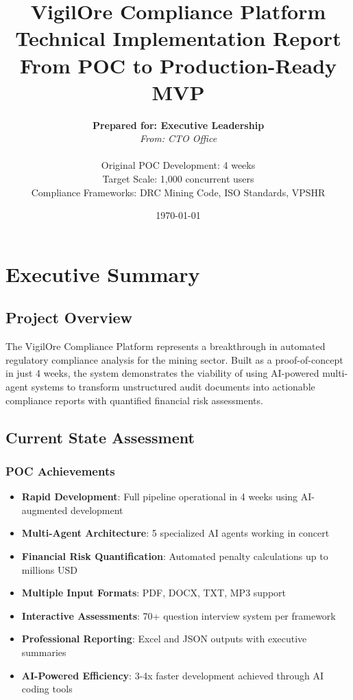 \documentclass[12pt,a4paper]{report}
\title{\textbf{VigilOre Compliance Platform}\\
\Large Technical Implementation Report\\
\large From POC to Production-Ready MVP}
\author{
    \textbf{Prepared for: Executive Leadership}\\
    \textit{From: CTO Office}\\
    \\
    Original POC Development: 4 weeks\\
    Target Scale: 1,000 concurrent users\\
    Compliance Frameworks: DRC Mining Code, ISO Standards, VPSHR
}
\date{\today}
\begin{document}
\maketitle

\tableofcontents
\newpage

\chapter{Executive Summary}

\section{Project Overview}

The VigilOre Compliance Platform represents a breakthrough in automated regulatory compliance analysis for the mining sector. Built as a proof-of-concept in just 4 weeks, the system demonstrates the viability of using AI-powered multi-agent systems to transform unstructured audit documents into actionable compliance reports with quantified financial risk assessments.

\section{Current State Assessment}

\subsection{POC Achievements}
\begin{itemize}
    \item \textbf{Rapid Development}: Full pipeline operational in 4 weeks using AI-augmented development
    \item \textbf{Multi-Agent Architecture}: 5 specialized AI agents working in concert
    \item \textbf{Financial Risk Quantification}: Automated penalty calculations up to millions USD
    \item \textbf{Multiple Input Formats}: PDF, DOCX, TXT, MP3 support
    \item \textbf{Interactive Assessments}: 70+ question interview system per framework
    \item \textbf{Professional Reporting}: Excel and JSON outputs with executive summaries
    \item \textbf{AI-Powered Efficiency}: 3-4x faster development achieved through AI coding tools
\end{itemize}
\end{document}
